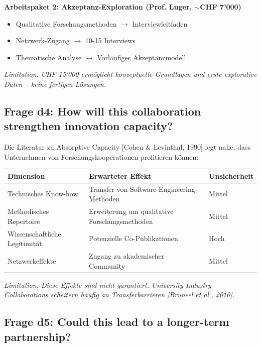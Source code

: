 \documentclass[11pt,a4paper]{article}
\newcommand{\limitation}[1]{\textcolor{limitation}{\textit{Limitation: #1}}}
\newcommand{\evidence}[1]{\textcolor{fehrgray}{[#1]}}
\begin{document}
\textbf{Arbeitspaket 2: Akzeptanz-Exploration (Prof. Luger, $\sim$CHF 7'000)}

\begin{itemize}[leftmargin=2em]
    \item Qualitative Forschungsmethoden $\rightarrow$ Interviewleitfaden
    \item Netzwerk-Zugang $\rightarrow$ 10-15 Interviews
    \item Thematische Analyse $\rightarrow$ Vorläufiges Akzeptanzmodell
\end{itemize}

\limitation{CHF 15'000 ermöglicht konzeptuelle Grundlagen und erste explorative Daten -- keine fertigen Lösungen.}

\subsection{Frage d4: How will this collaboration strengthen innovation capacity?}

Die Literatur zu Absorptive Capacity \evidence{Cohen \& Levinthal, 1990} legt nahe, dass Unternehmen von Forschungskooperationen profitieren können:

\begin{table}[h]
\centering
\begin{tabular}{@{}L{4.5cm}L{5.5cm}C{3cm}@{}}
\toprule
\textbf{Dimension} & \textbf{Erwarteter Effekt} & \textbf{Unsicherheit} \\
\midrule
Technisches Know-how & Transfer von Software-Engineering-Methoden & Mittel \\
Methodisches Repertoire & Erweiterung um qualitative Forschungsmethoden & Mittel \\
Wissenschaftliche Legitimität & Potenzielle Co-Publikationen & Hoch \\
Netzwerkeffekte & Zugang zu akademischer Community & Mittel \\
\bottomrule
\end{tabular}
\end{table}

\limitation{Diese Effekte sind nicht garantiert. University-Industry Collaborations scheitern häufig an Transferbarrieren \evidence{Bruneel et al., 2010}.}

\subsection{Frage d5: Could this lead to a longer-term partnership?}
\end{document}
